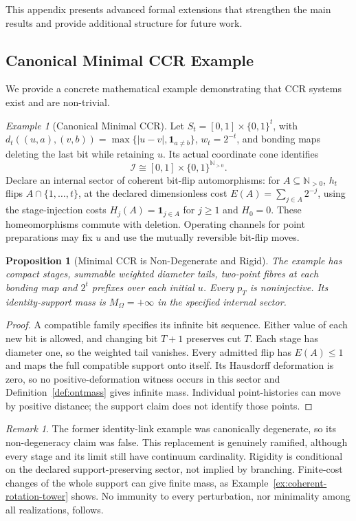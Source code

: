 \documentclass[11pt,a4paper]{article}
\theoremstyle{plain}
\newtheorem{proposition}[theorem]{Proposition}
\theoremstyle{definition}
\theoremstyle{remark}
\newtheorem{remark}[theorem]{Remark}
\newtheorem{example}[theorem]{Example}
\begin{document}
This appendix presents advanced formal extensions that strengthen the main results and provide additional structure for future work.

\subsection{Canonical Minimal CCR Example}

We provide a concrete mathematical example demonstrating that CCR systems exist and are non-trivial.

\begin{example}[Canonical Minimal CCR]\label{ex:minimal-ccr}
Let $S_t=[0,1]\times\{0,1\}^t$, with $d_t((u,a),(v,b))=\max\{|u-v|,\mathbf1_{a\ne b}\}$, $w_t=2^{-t}$, and bonding maps deleting the last bit while retaining $u$. Its actual coordinate cone identifies
\[
 \mathcal I\cong[0,1]\times\{0,1\}^{\mathbb N_{>0}}.
\]
Declare an internal sector of coherent bit-flip automorphisms: for $A\subseteq\mathbb N_{>0}$, $h_t$ flips $A\cap\{1,\ldots,t\}$, at the declared dimensionless cost $E(A)=\sum_{j\in A}2^{-j}$, using the stage-injection costs $H_j(A)=\mathbf1_{j\in A}$ for $j\ge1$ and $H_0=0$. These homeomorphisms commute with deletion. Operating channels for point preparations may fix $u$ and use the mutually reversible bit-flip moves.
\end{example}

\begin{proposition}[Minimal CCR is Non-Degenerate and Rigid]
The example has compact stages, summable weighted diameter tails, two-point fibres at each bonding map and $2^t$ prefixes over each initial $u$. Every $p_T$ is noninjective. Its identity-support mass is $M_\Omega=+\infty$ in the specified internal sector.
\end{proposition}
\begin{proof}
A compatible family specifies its infinite bit sequence. Either value of each new bit is allowed, and changing bit $T+1$ preserves cut $T$. Each stage has diameter one, so the weighted tail vanishes. Every admitted flip has $E(A)\le1$ and maps the full compatible support onto itself. Its Hausdorff deformation is zero, so no positive-deformation witness occurs in this sector and Definition~\ref{def:ontmass} gives infinite mass. Individual point-histories can move by positive distance; the support claim does not identify those points.
\end{proof}

\begin{remark}
The former identity-link example was canonically degenerate, so its non-degeneracy claim was false. This replacement is genuinely ramified, although every stage and its limit still have continuum cardinality. Rigidity is conditional on the declared support-preserving sector, not implied by branching. Finite-cost changes of the whole support can give finite mass, as Example~\ref{ex:coherent-rotation-tower} shows. No immunity to every perturbation, nor minimality among all realizations, follows.
\end{remark}
\end{document}
